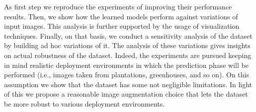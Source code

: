 As first step we reproduce the experiments of \cite{ref11} improving their performance results. Then, we show how the learned models perform against variations of input images. This analysis is further supported by the usage of visualization techniques. Finally, on that basis, we conduct a sensitivity analysis of the dataset by building ad hoc variations of it. The analysis of these variations gives insights on actual robustness of the dataset. Indeed, the experiments are pursued keeping in mind realistic deployment environments in which the prediction phase will be performed (i.e., images taken from plantations, greenhouses, and so on). On this assumption we show that the dataset has some not negligible limitations. In light of this we propose a reasonable image augmentation choice that lets the dataset be more robust to various deployment environments.
\vspace{-5pt}
